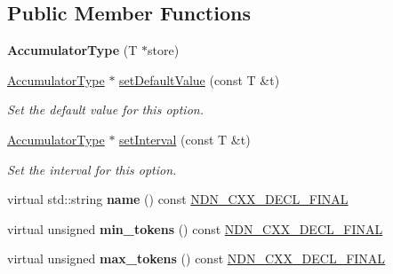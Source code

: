 \subsection*{Public Member Functions}
\begin{DoxyCompactItemize}
\item 
{\bfseries Accumulator\+Type} (T $\ast$store)\hypertarget{classAccumulatorType_ab00dcd74b84d521edc08c0568f0c39f6}{}\label{classAccumulatorType_ab00dcd74b84d521edc08c0568f0c39f6}

\item 
\hyperlink{classAccumulatorType}{Accumulator\+Type} $\ast$ \hyperlink{classAccumulatorType_af9b32491928d6027309823ec3f8705d2}{set\+Default\+Value} (const T \&t)\hypertarget{classAccumulatorType_af9b32491928d6027309823ec3f8705d2}{}\label{classAccumulatorType_af9b32491928d6027309823ec3f8705d2}

\begin{DoxyCompactList}\small\item\em Set the default value for this option. \end{DoxyCompactList}\item 
\hyperlink{classAccumulatorType}{Accumulator\+Type} $\ast$ \hyperlink{classAccumulatorType_a6ab31bd597bab53b1900169c8fb21f40}{set\+Interval} (const T \&t)
\begin{DoxyCompactList}\small\item\em Set the interval for this option. \end{DoxyCompactList}\item 
virtual std\+::string {\bfseries name} () const \hyperlink{ndn-cxx_2src_2common_8hpp_ab53a383abb72682805543301b5f2c244}{N\+D\+N\+\_\+\+C\+X\+X\+\_\+\+D\+E\+C\+L\+\_\+\+F\+I\+N\+AL}\hypertarget{classAccumulatorType_ace6c6e770c071776469432622ecee9d0}{}\label{classAccumulatorType_ace6c6e770c071776469432622ecee9d0}

\item 
virtual unsigned {\bfseries min\+\_\+tokens} () const \hyperlink{ndn-cxx_2src_2common_8hpp_ab53a383abb72682805543301b5f2c244}{N\+D\+N\+\_\+\+C\+X\+X\+\_\+\+D\+E\+C\+L\+\_\+\+F\+I\+N\+AL}\hypertarget{classAccumulatorType_ad6b066fbf931a02c9771e1d6a654e5ee}{}\label{classAccumulatorType_ad6b066fbf931a02c9771e1d6a654e5ee}

\item 
virtual unsigned {\bfseries max\+\_\+tokens} () const \hyperlink{ndn-cxx_2src_2common_8hpp_ab53a383abb72682805543301b5f2c244}{N\+D\+N\+\_\+\+C\+X\+X\+\_\+\+D\+E\+C\+L\+\_\+\+F\+I\+N\+AL}\hypertarget{classAccumulatorType_a73549cbb550f8be6b20f552018b265fc}{}\label{classAccumulatorType_a73549cbb550f8be6b20f552018b265fc}


\end{DoxyCompactItemize}
